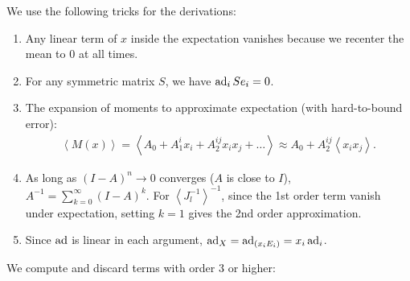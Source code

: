 \documentclass[12pt,class=article,crop=false]{standalone}
\begin{document}
We use the following tricks for the derivations:
\begin{enumerate}[label=(\arabic*)]
	\item Any linear term of $ x$ inside the expectation vanishes because we recenter the mean to 0 at all times.
\item For any symmetric matrix $ S$, we have $\operatorname{ad}_{ i} S e_i = 0 $.
\item The expansion of moments to approximate expectation (with hard-to-bound error):
\begin{align*}
	\left\langle M(x) \right\rangle = \left\langle A_0 + A_1^{i} x_i + A_2^{ij} x_i x_j + \ldots \right\rangle \approx A_0 + A_2^{ij} \left\langle x_i x_j \right\rangle .
\end{align*}
\item As long as $ (I-A)^{n} \to 0$ converges ($ A$ is close to  $ I$),  $ A^{-1} = \sum_{ k= 0}^{\infty} (I-A)^{k}$. For $ \left\langle J_l^{-1} \right\rangle^{-1}$, since the 1st order term vanish under expectation, setting $ k=1$ gives the 2nd order approximation.
\item Since $ \operatorname{ad}$ is linear in each argument, $ \operatorname{ad}_{ X} = \operatorname{ad}_{ (x_i E_i) } = x_i \operatorname{ad}_{ i}$.
\end{enumerate}
We compute and discard terms with order 3 or higher:
\end{document}
